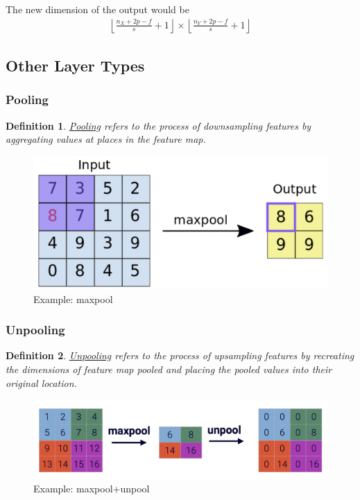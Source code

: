 \documentclass[11pt,a4paper]{article}
\newtheorem{definition}{Definition}
\begin{document}
The new dimension of the output would be
\begin{equation}
    \begin{aligned}
        \left\lfloor \frac{n_X+2p-f}{s}+1\right\rfloor\times\left\lfloor \frac{n_Y+2p-f}{s}+1\right\rfloor
    \end{aligned}
    \nonumber
\end{equation}

\subsection{Other Layer Types}
\subsubsection{Pooling}
\begin{definition}
    \underline{Pooling} refers to the process of downsampling features by aggregating values at places in the feature map.
\end{definition}
\begin{center}\begin{figure}[htbp]
    \centering
    \includegraphics[scale=0.1]{maxpool.png}
    \caption{Example: maxpool}
    \label{}
\end{figure}\end{center}

\subsubsection{Unpooling}
\begin{definition}
    \underline{Unpooling} refers to the process of upsampling features by recreating the dimensions of feature map pooled and placing the pooled values into their original location.
\end{definition}
\begin{center}\begin{figure}[htbp]
    \centering
    \includegraphics[scale=0.1]{unpool.png}
    \caption{Example: maxpool+unpool}
    \label{}
\end{figure}\end{center}
\end{document}
